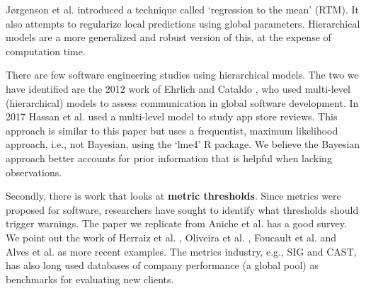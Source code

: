 \documentclass[sigconf,natbib=false]{acmart}
\begin{document}

Jørgenson et al. \cite{JORGENSEN2003} introduced a technique called `regression
to the mean' (RTM). It also attempts to regularize local predictions using
global parameters. 
Hierarchical models are a more generalized and robust version of this, at the
expense of computation time.

There are few software engineering studies using hierarchical models. The two we
have identified are the 2012 work of Ehrlich and Cataldo
\cite{Ehrlich:2012}, who used multi-level (hierarchical) models to assess
communication in global software development. In 2017 Hassan et al.
\cite{Hassan2017} used a multi-level model to study app store reviews. This
approach is similar to this paper but uses a frequentist, maximum likelihood
approach, i.e., not Bayesian, using the `lme4' R package.
We believe the Bayesian approach better accounts for prior information that is helpful when
 lacking observations.


Secondly, there is work that looks at \textbf{metric thresholds}. Since metrics
were proposed for software, researchers have sought to identify what thresholds
should trigger warnings. The paper we replicate from Aniche et al.
\cite{Aniche2016} has a good survey. We point out the work of Herraiz et al.
\cite{Herraiz2012}, Oliveira et al. \cite{oliveira14}, Foucault et al.
\cite{Foucault2014} and Alves et al. \cite{alves2010deriving} as more recent
examples. The metrics industry, e.g., SIG and CAST, has also long used databases
of company performance (a global pool) as benchmarks for evaluating new clients.
\end{document}
